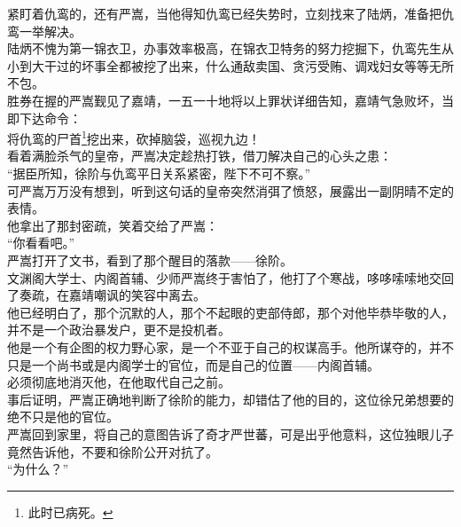 \begin{multicols}{\theparacolNo}
紧盯着仇鸾的，还有严嵩，当他得知仇鸾已经失势时，立刻找来了陆炳，准备把仇鸾一举解决。\\

陆炳不愧为第一锦衣卫，办事效率极高，在锦衣卫特务的努力挖掘下，仇鸾先生从小到大干过的坏事全都被挖了出来，什么通敌卖国、贪污受贿、调戏妇女等等无所不包。\\

胜券在握的严嵩觐见了嘉靖，一五一十地将以上罪状详细告知，嘉靖气急败坏，当即下达命令：\\

将仇鸾的尸首\footnote{此时已病死。}挖出来，砍掉脑袋，巡视九边！\\

看着满脸杀气的皇帝，严嵩决定趁热打铁，借刀解决自己的心头之患：\\

“据臣所知，徐阶与仇鸾平日关系紧密，陛下不可不察。”\\

可严嵩万万没有想到，听到这句话的皇帝突然消弭了愤怒，展露出一副阴晴不定的表情。\\

他拿出了那封密疏，笑着交给了严嵩：\\

“你看看吧。”\\

严嵩打开了文书，看到了那个醒目的落款——徐阶。\\

文渊阁大学士、内阁首辅、少师严嵩终于害怕了，他打了个寒战，哆哆嗦嗦地交回了奏疏，在嘉靖嘲讽的笑容中离去。\\

他已经明白了，那个沉默的人，那个不起眼的吏部侍郎，那个对他毕恭毕敬的人，并不是一个政治暴发户，更不是投机者。\\

他是一个有企图的权力野心家，是一个不亚于自己的权谋高手。他所谋夺的，并不只是一个尚书或是内阁学士的官位，而是自己的位置——内阁首辅。\\

必须彻底地消灭他，在他取代自己之前。\\

事后证明，严嵩正确地判断了徐阶的能力，却错估了他的目的，这位徐兄弟想要的绝不只是他的官位。\\

严嵩回到家里，将自己的意图告诉了奇才严世蕃，可是出乎他意料，这位独眼儿子竟然告诉他，不要和徐阶公开对抗了。\\

“为什么？”\\


\end{multicols}
